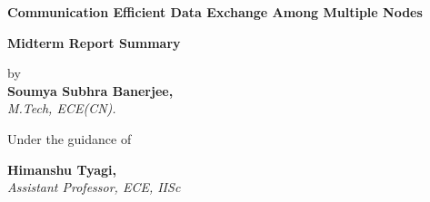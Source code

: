 \documentclass[
11pt, %
a4paper, %
oneside, %
headinclude,footinclude, %
BCOR5mm, %
]{scrartcl}
\begin{document}

\begin{center}
\begin{huge}
\vspace{1 in}
{\bf  Communication Efficient Data Exchange Among Multiple Nodes}\\  
\end{huge}
\vspace{1 cm}
\begin{large}
\textbf{Midterm Report Summary}\\
\end{large}
\begin{large}
\vspace{0.5cm}
{by\\}
\vspace{0.1cm}
{\textbf{Soumya Subhra Banerjee,} \\ \textit{M.Tech, ECE(CN).} }
\end{large}

\vspace{.2in}

\begin{large}
{ Under the guidance of}\\
\end{large}
\vspace{0.2cm}
\begin{large}
{\textbf{Himanshu Tyagi,}\\ \textit{Assistant Professor, ECE, IISc}}\end{large}
\vspace{1.0cm}

\end{center}





\end{document}
